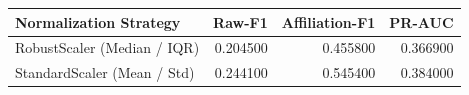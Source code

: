 \begin{tabular}{lrrr}
\toprule
Normalization Strategy & Raw-F1 & Affiliation-F1 & PR-AUC \\
\midrule
RobustScaler (Median / IQR) & 0.204500 & 0.455800 & 0.366900 \\
StandardScaler (Mean / Std) & 0.244100 & 0.545400 & 0.384000 \\
\bottomrule
\end{tabular}
